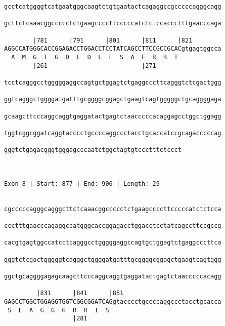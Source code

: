 \documentclass{article}
\begin{document}
\begin{Verbatim}
gcctcatggggtcatgaatgggcaagtctgtgaatactcagaggccgcccccagggcagg
                                                            
gcttctcaaacggccccctctgaagccccttcccccatctctccaccctttgaacccaga
                                                            
        |781      |791      |801      |811      |821        
AGGCCATGGGCACCGGAGACCTGGACCTCCTATCAGCCTTCCGCCGCACgtgagtggcca
  A  M  G  T  G  D  L  D  L  L  S  A  F  R  R  T            
        |261                          |271                  
  
tcctcagggcctgggggaggccagtgctggagtctgaggcccttcagggtctcgactggg
                                                            
ggtcagggctggggatgatttgcggggcggagctgaagtcagtgggggctgcaggggaga
                                                            
gcaagcttcccaggcaggtgaggatactgagtctaacccccacaggagcctggctggagg
                                                            
tggtcggcggatcaggtacccctgccccaggccctacctgcaccatccgcagacccccag
                                                            
gggtctgagacgggtgggagcccaatctggctagtgtccctttctccct
                                                 
                                                 
 
Exon 8 | Start: 877 | End: 906 | Length: 29


cgcccccagggcagggcttctcaaacggccccctctgaagccccttcccccatctctcca
                                                            
ccctttgaacccagaggccatgggcaccggagacctggacctcctatcagccttccgccg
                                                            
cacgtgagtggccatcctcagggcctgggggaggccagtgctggagtctgaggcccttca
                                                            
gggtctcgactgggggtcagggctggggatgatttgcggggcggagctgaagtcagtggg
                                                            
ggctgcaggggagagcaagcttcccaggcaggtgaggatactgagtctaacccccacagg
                                                            
         |831      |841      |851                           
GAGCCTGGCTGGAGGTGGTCGGCGGATCAGgtacccctgccccaggccctacctgcacca
 S  L  A  G  G  G  R  R  I  S                               
                   |281                                     
  

\end{Verbatim}
\end{document}

